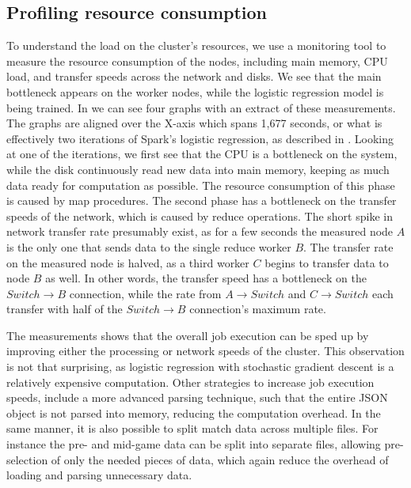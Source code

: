 \subsection{Profiling resource consumption}\label{sec:profile}
To understand the load on the cluster's resources, we use a monitoring tool to measure the resource consumption of the nodes, including main memory, CPU load, and transfer speeds across the network and disks. We see that the main bottleneck appears on the worker nodes, while the logistic regression model is being trained. In 
we can see four graphs with an extract of these measurements. The graphs are aligned over the X-axis which spans 1,677 seconds, or what is effectively two iterations of Spark's logistic regression, as described in . Looking at one of the iterations, we first see that the CPU is a bottleneck on the system, while the disk continuously read new data into main memory, keeping as much data ready for computation as possible. The resource consumption of this phase is caused by map procedures. The second phase has a bottleneck on the transfer speeds of the network, which is caused by reduce operations. The short spike in network transfer rate presumably exist, as for a few seconds the measured node $A$ is the only one that sends data to the single reduce worker $B$. The transfer rate on the measured node is halved, as a third worker $C$ begins to transfer data to node $B$ as well. In other words, the transfer speed has a bottleneck on the $Switch \rightarrow B$ connection, while the rate from $A \rightarrow Switch$ and $C \rightarrow Switch$ each transfer with half of the $Switch \rightarrow B$ connection's maximum rate.

The measurements shows that the overall job execution can be sped up by improving either the processing or network speeds of the cluster. This observation is not that surprising, as logistic regression with stochastic gradient descent is a relatively expensive computation. Other strategies to increase job execution speeds, include a more advanced parsing technique, such that the entire JSON object is not parsed into memory, reducing the computation overhead. In the same manner, it is also possible to split match data across multiple files. For instance the pre- and mid-game data can be split into separate files, allowing pre-selection of only the needed pieces of data, which again reduce the overhead of loading and parsing unnecessary data.

